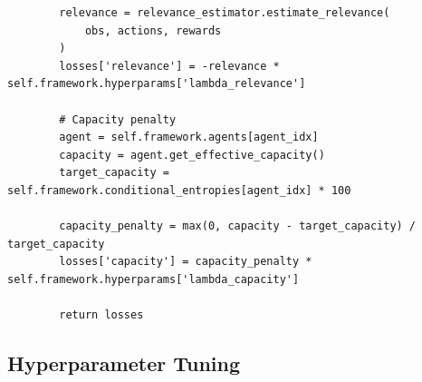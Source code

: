 \documentclass[10pt, letterpaper]{article}
\begin{document}
\begin{lstlisting}
        relevance = relevance_estimator.estimate_relevance(
            obs, actions, rewards
        )
        losses['relevance'] = -relevance * self.framework.hyperparams['lambda_relevance']

        # Capacity penalty
        agent = self.framework.agents[agent_idx]
        capacity = agent.get_effective_capacity()
        target_capacity = self.framework.conditional_entropies[agent_idx] * 100

        capacity_penalty = max(0, capacity - target_capacity) / target_capacity
        losses['capacity'] = capacity_penalty * self.framework.hyperparams['lambda_capacity']

        return losses
\end{lstlisting}

\subsection{Hyperparameter Tuning}
\end{document}
